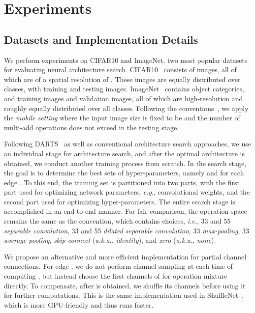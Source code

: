 \documentclass{article} \usepackage{iclr2020_conference,times}
\begin{document}
\section{Experiments}
\label{Experiments}



\subsection{Datasets and Implementation Details}
\label{Experiments:Settings}

We perform experiments on CIFAR10 and ImageNet, two most popular datasets for evaluating neural architecture search. CIFAR10~\citep{krizhevsky2009learning} consists of  images, all of which are of a spatial resolution of . These images are equally distributed over  classes, with  training and  testing images. ImageNet~\citep{deng2009imagenet} contains  object categories, and  training images and  validation images, all of which are high-resolution and roughly equally distributed over all classes. Following the conventions~\citep{zoph2018learning,liu2018darts}, we apply the \textit{mobile setting} where the input image size is fixed to be  and the number of multi-add operations does not exceed  in the testing stage.

Following DARTS~\citep{liu2018darts} as well as conventional architecture search approaches, we use an individual stage for architecture search, and after the optimal architecture is obtained, we conduct another training process from scratch. In the search stage, the goal is to determine the best sets of hyper-parameters, namely  and  for each edge . To this end, the trainnig set is partitioned into two parts, with the first part used for optimizing network parameters, \textit{e.g.}, convolutional weights, and the second part used for optimizing hyper-parameters. The entire search stage is accomplished in an end-to-end manner. For fair comparison, the operation space  remains the same as the convention, which contains  choices, \textit{i.e.}, 33 and 55 \textit{separable convolution}, 33 and 55 \textit{dilated separable convolution}, 33 \textit{max-pooling}, 33 \textit{average-pooling}, \textit{skip-connect} (\textit{a.k.a.}, \textit{identity}), and \textit{zero} (\textit{a.k.a.}, \textit{none}).

We propose an alternative and more efficient implementation for partial channel connections. For edge , we do not perform channel sampling at each time of computing , but instead choose the first  channels of  for operation mixture directly. To compensate, after  is obtained, we shuffle its channels before using it for further computations. This is the same implementation used in ShuffleNet~\citep{zhang2018shufflenet}, which is more GPU-friendly and thus runs faster.
\end{document}
